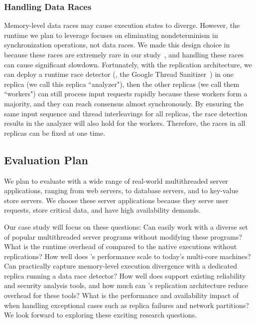 \subsubsection{Handling Data Races} \label{sec:rep-resource}
Memory-level data races may cause execution states to diverge. However, the
\parrot \smt runtime we plan to leverage focuses on eliminating nondeterminism
in synchronization operations, not data races. We made this design choice in
\parrot because these races are extremely rare in our
study~\cite{peregrine:sosp11}, and handling these races can cause significant
slowdown. Fortunately, with the \crane replication architecture, we can deploy a
runtime race detector (\eg, the Google Thread
Sanitizer~\cite{google-thread-sanitizer}) in one replica (we call this replica
``analyzer"), then the other replicas (we call them ``workers") can still
process input requests rapidly because these workers form a majority, and they
can reach consensus almost synchronously. By ensuring the same input sequence
and thread interleavings for all replicas, the race detection results in the
analyzer will also hold for the workers. Therefore, the races in all replicas
can be fixed at one time.



\subsection{Evaluation Plan} \label{sec:rep-eval}
We plan to evaluate \crane with a wide range of real-world multithreaded server
applications, ranging from web servers, to database servers, and to key-value
store servers. We choose these server applications because they serve user
requests, store critical data, and have high availability demands.

Our case study will focus on these questions: Can \crane easily work with a
diverse set of popular multithreaded server programs without modifying these
programs? What is the runtime overhead of \crane compared to the native
executions without replications? How well does \crane's performance scale to
today's multi-core machines? Can \crane practically capture memory-level
execution divergence with a dedicated replica running a data race detector? How
well does \crane support existing reliability and security analysis tools, and
how much can \crane's replication architecture reduce overhead for these tools?
What is the performance and availability impact of \crane when handling
exceptional cases such as replica failures and network partitions? We look
forward to exploring these exciting research questions.




